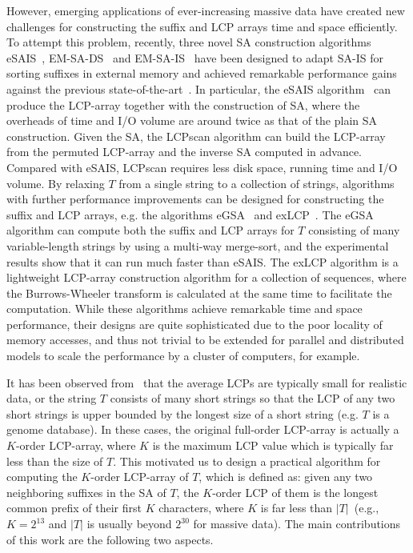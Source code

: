 \documentclass{llncs}
\begin{document}
However, emerging applications of ever-increasing massive data have created new challenges for constructing the suffix and LCP arrays time and space efficiently. To attempt this problem, recently, three novel SA construction algorithms eSAIS~\cite{Bingmann12}, EM-SA-DS~\cite{Nong14} and EM-SA-IS~\cite{Nong15} have been designed to adapt SA-IS for sorting suffixes in external memory and achieved remarkable performance gains against the previous state-of-the-art~\cite{Dementiev08}. In particular, the eSAIS algorithm~\cite{Bingmann12} can produce the LCP-array together with the construction of SA, where the overheads of time and I/O volume are around twice as that of the plain SA construction. Given the SA, the LCPscan algorithm \cite{Juha2014} can build the LCP-array from the permuted LCP-array and the inverse SA computed in advance. Compared with eSAIS, LCPscan requires less disk space, running time and I/O volume.
By relaxing $T$ from a single string to a collection of strings, algorithms with further performance improvements can be designed for constructing the suffix and LCP arrays, e.g. the algorithms eGSA~\cite{Felipe2013} and exLCP~\cite{Markus2012}. The eGSA algorithm can compute both the suffix and LCP arrays for $T$ consisting of many variable-length strings by using a multi-way merge-sort, and the experimental results show that it can run much faster than eSAIS. The exLCP algorithm is a lightweight LCP-array construction algorithm for a collection of sequences, where the Burrows-Wheeler transform is calculated at the same time to facilitate the computation. While these algorithms achieve remarkable time and space performance, their designs are quite sophisticated due to the poor locality of memory accesses, and thus not trivial to be extended for parallel and distributed models to scale the performance by a cluster of computers, for example.

It has been observed from~\cite{Felipe2013} that the average LCPs are typically small for realistic data, or the string $T$ consists of many short strings so that the LCP of any two short strings is upper bounded by the longest size of a short string (e.g. $T$ is a genome database). In these cases, the original full-order LCP-array is actually a $K$-order LCP-array, where $K$ is the maximum LCP value which is typically far less than the size of $T$.
This motivated us to design a practical algorithm for computing the $K$-order LCP-array of $T$, which is defined as: given any two neighboring suffixes in the SA of $T$, the $K$-order LCP of them is the longest common prefix of their first $K$ characters, where $K$ is far less than $|T|$~(e.g., $K=2 ^{13}$ and $|T|$ is usually beyond $2^{30}$ for massive data). The main contributions of this work are the following two aspects.
\end{document}
